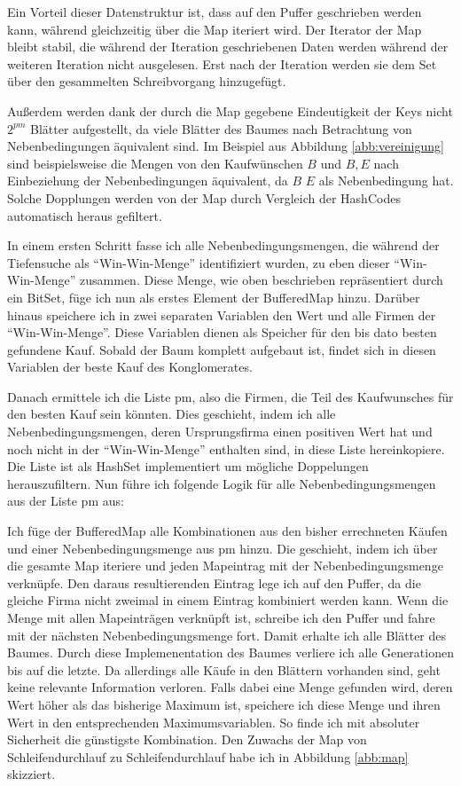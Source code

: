 Ein Vorteil dieser Datenstruktur ist, dass auf den Puffer geschrieben werden kann, während gleichzeitig über die Map iteriert wird. Der Iterator der Map bleibt stabil, die während der Iteration geschriebenen Daten werden während der weiteren Iteration nicht ausgelesen. Erst nach der Iteration werden sie dem Set über den gesammelten Schreibvorgang hinzugefügt.

Außerdem werden dank der durch die Map gegebene Eindeutigkeit der Keys nicht \(2^{pm}\) Blätter aufgestellt, da viele Blätter des Baumes nach Betrachtung von Nebenbedingungen äquivalent sind. Im Beispiel aus Abbildung \ref{abb:vereinigung} sind beispielsweise die Mengen von den Kaufwünschen \(B\) und \(B, E\) nach Einbeziehung der Nebenbedingungen äquivalent, da \(B\) \(E\) als Nebenbedingung hat. Solche Dopplungen werden von der Map durch Vergleich der HashCodes automatisch heraus gefiltert.

In einem ersten Schritt fasse ich alle Nebenbedingungsmengen, die während der Tiefensuche als "`Win-Win-Menge"' identifiziert wurden, zu eben dieser "`Win-Win-Menge"' zusammen. Diese Menge, wie oben beschrieben repräsentiert durch ein BitSet, füge ich nun als erstes Element der BufferedMap hinzu.
Darüber hinaus speichere ich in zwei separaten Variablen den Wert und alle Firmen der "`Win-Win-Menge"'. Diese Variablen dienen als Speicher für den bis dato besten gefundene Kauf. Sobald der Baum komplett aufgebaut ist, findet sich in diesen Variablen der beste Kauf des Konglomerates.

Danach ermittele ich die Liste pm, also die Firmen, die Teil des Kaufwunsches für den besten Kauf sein könnten. Dies geschieht, indem ich alle Nebenbedingungsmengen, deren Ursprungsfirma einen positiven Wert hat und noch nicht in der "`Win-Win-Menge"' enthalten sind, in diese Liste hereinkopiere. Die Liste ist als HashSet implementiert um mögliche Doppelungen herauszufiltern. Nun führe ich folgende Logik für alle Nebenbedingungsmengen aus der Liste pm aus:

Ich füge der BufferedMap alle Kombinationen aus den bisher errechneten Käufen und einer Nebenbedingungsmenge aus pm hinzu. Die geschieht, indem ich über die gesamte Map iteriere und jeden Mapeintrag mit der Nebenbedingungsmenge verknüpfe. Den daraus resultierenden Eintrag lege ich auf den Puffer, da die gleiche Firma nicht zweimal in einem Eintrag kombiniert werden kann. Wenn die Menge mit allen Mapeinträgen verknüpft ist, schreibe ich den Puffer und fahre mit der nächsten Nebenbedingungsmenge fort. Damit erhalte ich alle Blätter des Baumes. Durch diese Implemenentation des Baumes verliere ich alle Generationen bis auf die letzte. Da allerdings alle Käufe in den Blättern vorhanden sind, geht keine relevante Information verloren. Falls dabei eine Menge gefunden wird, deren Wert höher als das bisherige Maximum ist, speichere ich diese Menge und ihren Wert in den entsprechenden Maximumsvariablen. So finde ich mit absoluter Sicherheit die günstigste Kombination. Den Zuwachs der Map von Schleifendurchlauf zu Schleifendurchlauf habe ich in Abbildung \ref{abb:map} skizziert.


